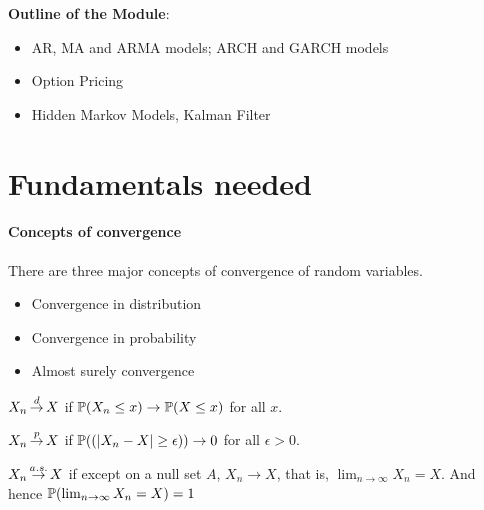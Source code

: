 \documentclass[a4 paper]{article}
\begin{document}
\textbf{Outline of the Module}: 
\begin{itemize}
    \item  AR, MA and ARMA models; ARCH and GARCH models 
    \item Option Pricing
    \item Hidden Markov Models, Kalman Filter
\end{itemize}

 


	
\tableofcontents
\thispagestyle{empty} 
  


\section{Fundamentals needed} %
\label{sec:basics}

\paragraph{Concepts of convergence} %
\label{sub:convergence_in_distirbution}
There are three major concepts of convergence of random variables.
\begin{itemize}
    \item Convergence in distribution
    \item Convergence in probability
    \item Almost surely convergence
\end{itemize}

\begin{defn}
    $X_n \cid X$ if $\mathbb{P}(X_n \leq x) \rightarrow \mathbb{P}( X \leq x)$ for all $x$.
\end{defn}

\begin{defn}
    $X_n \cip X$ if $\mathbb{P}( (|X_n - X | \geq \epsilon)) \rightarrow 0$ for all $\epsilon > 0$.
\end{defn}

\begin{defn}
    $X_n \cas X$ if except on a null set $A$, $X_n \rightarrow X$, that is, $\lim_{n \rightarrow \infty} X_n = X$.  And hence $\mathbb{P}( \lim_{n \rightarrow \infty} X_n = X) = 1$
\end{defn}
\end{document}
